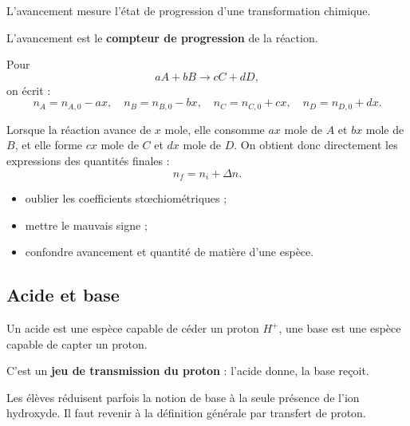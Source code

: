\documentclass[11pt,a4paper]{article}
\begin{document}
\begin{sens}
L'avancement mesure l'état de progression d'une transformation chimique.
\end{sens}

\begin{imagem}
L'avancement est le \textbf{compteur de progression} de la réaction.
\end{imagem}

\begin{bilan}
Pour
\[
aA+bB \longrightarrow cC+dD,
\]
on écrit :
\[
n_A=n_{A,0}-ax,\quad
n_B=n_{B,0}-bx,\quad
n_C=n_{C,0}+cx,\quad
n_D=n_{D,0}+dx.
\]
\end{bilan}

\begin{demo}
Lorsque la réaction avance de \(x\) mole, elle consomme \(ax\) mole de \(A\) et \(bx\) mole de \(B\),
et elle forme \(cx\) mole de \(C\) et \(dx\) mole de \(D\).
On obtient donc directement les expressions des quantités finales :
\[
n_f = n_i + \Delta n.
\]
\end{demo}

\begin{erreurs}
\begin{itemize}
    \item oublier les coefficients stœchiométriques ;
    \item mettre le mauvais signe ;
    \item confondre avancement et quantité de matière d'une espèce.
\end{itemize}
\end{erreurs}

\subsection{Acide et base}

\begin{sens}
Un acide est une espèce capable de céder un proton \(H^+\),
une base est une espèce capable de capter un proton.
\end{sens}

\begin{imagem}
C'est un \textbf{jeu de transmission du proton} :
l'acide donne, la base reçoit.
\end{imagem}

\begin{fausseintuition}
Les élèves réduisent parfois la notion de base à la seule présence de l'ion hydroxyde.
Il faut revenir à la définition générale par transfert de proton.
\end{fausseintuition}
\end{document}
